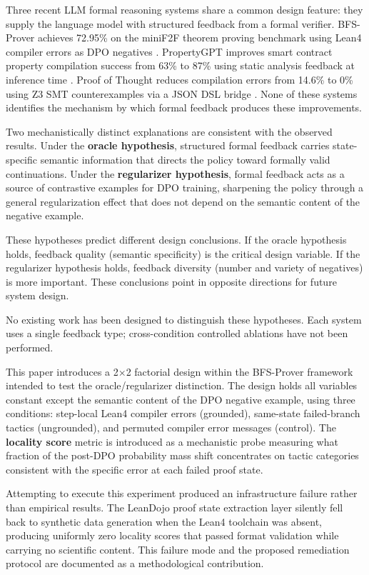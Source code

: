 
Three recent LLM formal reasoning systems share a common design feature: they supply the language model with structured feedback from a formal verifier. BFS-Prover achieves 72.95\% on the miniF2F theorem proving benchmark using Lean4 compiler errors as DPO negatives \citep{Xinetal2025}. PropertyGPT improves smart contract property compilation success from 63\% to 87\% using static analysis feedback at inference time \citep{Liuetal2024}. Proof of Thought reduces compilation errors from 14.6\% to 0\% using Z3 SMT counterexamples via a JSON DSL bridge \citep{Gangulyetal2024}. None of these systems identifies the mechanism by which formal feedback produces these improvements.

Two mechanistically distinct explanations are consistent with the observed results. Under the \textbf{oracle hypothesis}, structured formal feedback carries state-specific semantic information that directs the policy toward formally valid continuations. Under the \textbf{regularizer hypothesis}, formal feedback acts as a source of contrastive examples for DPO training, sharpening the policy through a general regularization effect that does not depend on the semantic content of the negative example.

These hypotheses predict different design conclusions. If the oracle hypothesis holds, feedback quality (semantic specificity) is the critical design variable. If the regularizer hypothesis holds, feedback diversity (number and variety of negatives) is more important. These conclusions point in opposite directions for future system design.

No existing work has been designed to distinguish these hypotheses. Each system uses a single feedback type; cross-condition controlled ablations have not been performed.

This paper introduces a 2×2 factorial design within the BFS-Prover framework intended to test the oracle/regularizer distinction. The design holds all variables constant except the semantic content of the DPO negative example, using three conditions: step-local Lean4 compiler errors (grounded), same-state failed-branch tactics (ungrounded), and permuted compiler error messages (control). The \textbf{locality score} metric is introduced as a mechanistic probe measuring what fraction of the post-DPO probability mass shift concentrates on tactic categories consistent with the specific error at each failed proof state.

Attempting to execute this experiment produced an infrastructure failure rather than empirical results. The LeanDojo proof state extraction layer silently fell back to synthetic data generation when the Lean4 toolchain was absent, producing uniformly zero locality scores that passed format validation while carrying no scientific content. This failure mode and the proposed remediation protocol are documented as a methodological contribution.

